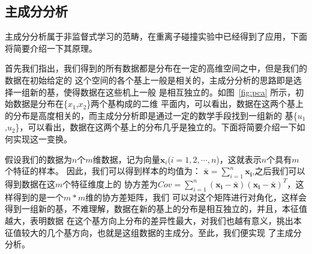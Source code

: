 \documentclass[aps,pre,12pt,preprint,onecolumn,showpacs,showkeys]{revtex4-1}
\begin{document}
\subsection{主成分分析}
主成分分析属于非监督式学习的范畴，在重离子碰撞实验中已经得到了应用\cite{1903.09833}，下面将简要介绍一下其原理。\par
首先我们指出，我们得到的所有数据都是分布在一定的高维空间之中，但是我们的数据在初始给定的
这个空间的各个基上一般是相关的，主成分分析的思路即是选择一组新的基，使得数据在这些机上一般
是相互独立的。如图~\ref{fig:pca} 所示，初始数据是分布在\{$x_{1}$,$x_{2}$\}两个基构成的二维
平面内，可以看出，数据在这两个基上的分布是高度相关的，而主成分分析即是通过一定的数学手段找到一组新的
基\{$u_{1}$,$u_{2}$\}，可以看出，数据在这两个基上的分布几乎是独立的。下面将简要介绍一下如何实现这一变换。\par
假设我们的数据为$n$个$m$维数据，记为向量$\bm x_{i}$($i=1,2,\cdots,n$)，这就表示$n$个具有$m$个特征的样本。
因此，我们可以得到样本的均值为：
$\bm{\bar{x}}=\sum_{i=1}^{n}\bm{x_{i}}$,之后我们可以得到数据在这$m$个特征维度上的
协方差为$Cov=\sum_{i=1}^{n}\bm{(x_{i}-\bar{x})(x_{i}-\bar{x})}^{T}$，这样得到的是一个$m*m$维的协方差矩阵，我们
可以对这个矩阵进行对角化，这样会得到一组新的基，不难理解，数据在新的基上的分布是相互独立的，并且，本征值越大，表明数据
在这个基方向上分布的差异性最大，对我们也越有意义，挑出本征值较大的几个基方向，也就是这组数据的主成分。至此，我们便实现
了主成分分析。
\end{document}
